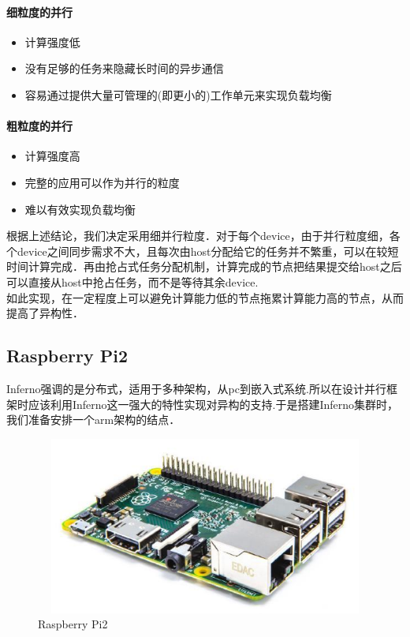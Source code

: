\documentclass[paper=a4]{ctexart} %
\numberwithin{equation}{section} %
\numberwithin{figure}{section} %
\numberwithin{table}{section} %
\newcommand{\n}{\\\indent}
\begin{document}
\paragraph{细粒度的并行}
\begin{itemize}
\item 计算强度低
\item 没有足够的任务来隐藏长时间的异步通信
\item 容易通过提供大量可管理的(即更小的)工作单元来实现负载均衡
\end{itemize}

\paragraph{粗粒度的并行}
\begin{itemize}
\item 计算强度高
\item 完整的应用可以作为并行的粒度
\item 难以有效实现负载均衡
\end{itemize}

根据上述结论，我们决定采用细并行粒度．对于每个device，由于并行粒度细，各个device之间同步需求不大，且每次由host分配给它的任务并不繁重，可以在较短时间计算完成．再由抢占式任务分配机制，计算完成的节点把结果提交给host之后可以直接从host中抢占任务，而不是等待其余device.　\n
如此实现，在一定程度上可以避免计算能力低的节点拖累计算能力高的节点，从而提高了异构性．

\subsection{Raspberry Pi2}
Inferno强调的是分布式，适用于多种架构，从pc到嵌入式系统.所以在设计并行框架时应该利用Inferno这一强大的特性实现对异构的支持.于是搭建Inferno集群时，我们准备安排一个arm架构的结点．\n
\begin{figure}[htbp]
\centering
\includegraphics[width=4.8in,height=2.3in]{pic/raspberry-pi.jpg}
\caption{Raspberry Pi2}
\end{figure}
\end{document}
